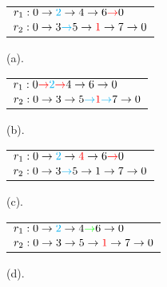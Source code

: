 \documentclass[12pt]{report}
\begin{document}
	\begin{figure}[!h]
		\centering
		\begin{minipage}{0.45\textwidth}
			\centering
			\begin{tabular}{l}
				$r_1:0 \rightarrow \textcolor{cyan}{2} \rightarrow 4 \rightarrow 6 \textcolor{red}{\rightarrow} 0$ \\
				$r_2:0 \rightarrow 3 \textcolor{cyan}{\rightarrow} 5 \rightarrow \textcolor{red}{1} \rightarrow 7 \rightarrow 0$ \\
			\end{tabular}
			\caption*{(a).}
		\end{minipage}%
		\hfill
		\begin{minipage}{0.45\textwidth}
			\centering
			\begin{tabular}{l}
				$r_1:0 \textcolor{red}{\rightarrow} \textcolor{cyan}{2} \textcolor{red}{\rightarrow} 4 \rightarrow 6 \rightarrow 0$ \\
				$r_2:0 \rightarrow 3 \rightarrow 5 \textcolor{cyan}{\rightarrow} \textcolor{red}{1} \textcolor{cyan}{\rightarrow} 7 \rightarrow 0$ \\
			\end{tabular}
			\caption*{(b).}
		\end{minipage}%
		\vspace{0.5cm}
		\begin{minipage}{0.45\textwidth}
			\centering
			\begin{tabular}{l}
				$r_1:0 \rightarrow \textcolor{cyan}{2} \rightarrow \textcolor{red}{4} \rightarrow 6 \textcolor{red}{\rightarrow} 0$ \\
				$r_2:0 \rightarrow 3 \textcolor{cyan}{\rightarrow} 5 \rightarrow 1 \rightarrow 7 \rightarrow 0$ \\
			\end{tabular}
			\caption*{(c).}
		\end{minipage}
		\hfill
		\begin{minipage}{0.45\textwidth}
			\centering
			\begin{tabular}{l}
				$r_1:0 \rightarrow \textcolor{cyan}{2} \rightarrow 4 \textcolor{green}{\rightarrow} 6 \rightarrow 0$ \\
				$r_2:0 \rightarrow 3 \rightarrow 5 \rightarrow \textcolor{red}{1} \rightarrow 7 \rightarrow 0$ \\
			\end{tabular}
			\caption*{(d).}
		\end{minipage}
		\begin{minipage}{0.45\textwidth}

\end{minipage}
\end{figure}
\end{document}
